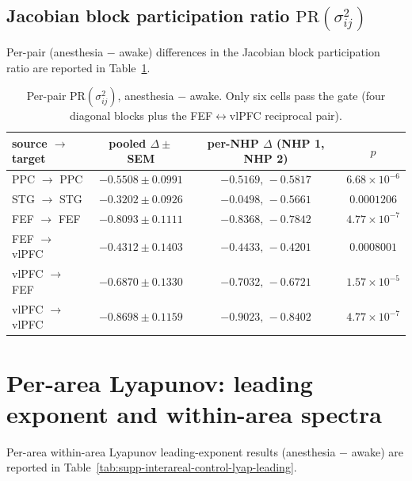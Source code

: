 \subsection*{Jacobian block participation ratio $\mathrm{PR}(\sigma^{2}_{ij})$}\label{supp:interareal-control-tab-pr}

Per-pair (anesthesia $-$ awake) differences in the Jacobian block participation ratio are reported in Table~\ref{tab:supp-interareal-control-pr}.

\begin{table}[h!]
\centering
\small
\caption[Per-pair Jacobian block participation ratio]{Per-pair $\mathrm{PR}(\sigma^{2}_{ij})$, anesthesia $-$ awake. Only six cells pass the gate (four diagonal blocks plus the FEF$\leftrightarrow$vlPFC reciprocal pair).}
\label{tab:supp-interareal-control-pr}
\begin{tabular}{lccc}
\toprule
source $\to$ target & pooled $\Delta\pm$SEM & per-NHP $\Delta$ (NHP 1, NHP 2) & $p$ \\
\midrule
PPC $\to$ PPC   & $-0.5508\pm 0.0991$ & $-0.5169,\,-0.5817$ & $6.68\!\times\!10^{-6}$ \\
STG $\to$ STG   & $-0.3202\pm 0.0926$ & $-0.0498,\,-0.5661$ & $0.0001206$ \\
FEF $\to$ FEF   & $-0.8093\pm 0.1111$ & $-0.8368,\,-0.7842$ & $4.77\!\times\!10^{-7}$ \\
FEF $\to$ vlPFC & $-0.4312\pm 0.1403$ & $-0.4433,\,-0.4201$ & $0.0008001$ \\
vlPFC $\to$ FEF & $-0.6870\pm 0.1330$ & $-0.7032,\,-0.6721$ & $1.57\!\times\!10^{-5}$ \\
vlPFC $\to$ vlPFC & $-0.8698\pm 0.1159$ & $-0.9023,\,-0.8402$ & $4.77\!\times\!10^{-7}$ \\
\bottomrule
\end{tabular}
\end{table}

\section{Per-area Lyapunov: leading exponent and within-area spectra}\label{supp:interareal-control-lyap-extra}

Per-area within-area Lyapunov leading-exponent results (anesthesia $-$ awake) are reported in Table~\ref{tab:supp-interareal-control-lyap-leading}.

